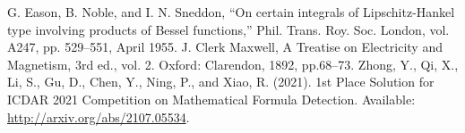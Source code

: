  G. Eason, B. Noble, and I. N. Sneddon, ``On certain integrals of Lipschitz-Hankel type involving products of Bessel functions,'' Phil. Trans. Roy. Soc. London, vol. A247, pp. 529--551, April 1955.
 J. Clerk Maxwell, A Treatise on Electricity and Magnetism, 3rd ed., vol. 2. Oxford: Clarendon, 1892, pp.68--73.
 Zhong, Y., Qi, X., Li, S., Gu, D., Chen, Y., Ning, P., and Xiao, R. (2021). 1st Place Solution for ICDAR 2021 Competition on Mathematical Formula Detection.  Available: \url{http://arxiv.org/abs/2107.05534}.
